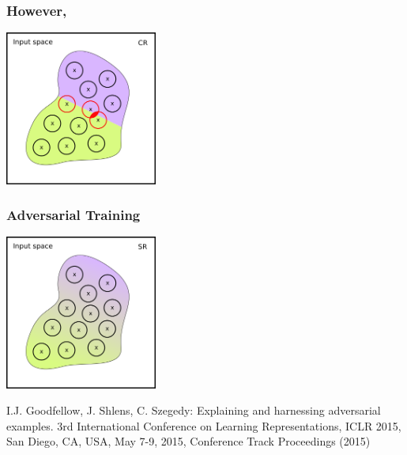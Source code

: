 \documentclass[aspectratio=169]{beamer}
\begin{document}
\begin{frame}[fragile]
  \frametitle{However,}



\begin{center}

  \includegraphics[width=5cm]{Images/SR-vs-CR-5.png}

  \end{center}

 \end{frame}

 \begin{frame}[fragile]
  \frametitle{Adversarial Training}



\begin{center}

  \includegraphics[width=5cm]{Images/SR-vs-CR-3.png}

  \end{center}
   {\scriptsize
   \begin{thebibliography}{99}
        \beamertemplatearticlebibitems
I.J. Goodfellow, J. Shlens, C. Szegedy: Explaining and harnessing adversarial examples. 3rd International Conference on Learning Representations,
ICLR 2015, San Diego, CA, USA, May 7-9, 2015, Conference Track Proceedings (2015)
 \end{thebibliography}}
 \end{frame}
\end{document}
